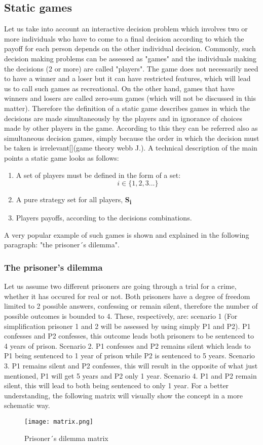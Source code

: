 \documentclass[conference]{IEEEtran}
\begin{document}
\subsection{Static games}
Let us take into account an interactive decision problem which involves two or more individuals who have to come to a final decision according to which the payoff for each person depends on the other individual decision. Commonly, such decision making problems can be assessed as "games" and the individuals making the decisions (2 or more) are called "players". The game does not necessarily need to have a winner and a loser but it can have restricted features, which will lead us to call such games as recreational. On the other hand, games
that have winners and losers are called zero-sum games (which will not be discussed in this matter). 
Therefore the definition of a static game describes games in which the decisions are made simultaneously by the players and in ignorance of choices made by other players in the game. According to this they can be referred also as simultaneous decision games, simply because the order in which the decision must be taken is irrelevant[](game theory webb J.). A technical description of the main points a static game looks as follows:
\begin{enumerate}
  \item A set of players must be defined in the form of a set: \[i\in       \{1,2,3...\}\]
  \item A pure strategy set for all players, \textbf{S{\textsubscript{i}}}
  \item Players payoffs, according to the decisions combinations.
\end{enumerate} 
A very popular example of such games is shown and explained in the following paragraph: "the prisoner´s dilemma".
\subsubsection{The prisoner's dilemma}
Let us assume two different prisoners are going through a trial for a crime, whether it has occured for real or not. Both prisoners have a degree of freedom limited to 2 possible answers, confessing or remain silent, therefore the number of possible outcomes is bounded to 4. These, respectively, are: scenario 1 (For simplification prisoner 1 and 2 will be assessed by using simply P1 and P2). P1 confesses and P2 confesses, this outcome leads both prisoners to be sentenced to 4 years of prison. Scenario 2. P1 confesses and P2 remains silent which leads to P1 being sentenced to 1 year of prison while P2 is sentenced to 5 years. Scenario 3. P1 remains silent and P2 confesses, this will result in the opposite of what just mentioned, P1 will get 5 years and P2 only 1 year. Scenario 4. P1 and P2 remain silent, this will lead to both being sentenced to only 1 year. For a better understanding, the following matrix will visually show the concept in a more schematic way.
\begin{figure}[h]
    \centerline{\texttt{[image: matrix.png]}}
    \caption{Prisoner´s dilemma matrix}
    \label{pdmatrix}
\end{figure}
\end{document}
